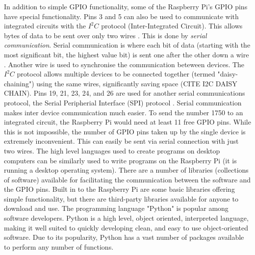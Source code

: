 \documentclass[a4]{report}
\begin{document}
	In addition to simple GPIO functionality, some of the Raspberry Pi's GPIO pins have special functionality. Pins 3 and 5 can also be used to communicate with integrated circuits with the \(I^2 C\) protocol (Inter-Integrated Circuit). This allows bytes of data to be sent over only two wires \cite{backwhatisi2c}. This is done by \textit{serial communication}. Serial communication is where each bit of data (starting with the most significant bit, the highest value bit) is sent one after the other down a wire \cite{backwhatisserpar}. Another wire is used to synchronise the communication beteween devices. The \(I^2 C\) protocol allows multiple devices to be connected together (termed "daisy-chaining") using the same wires, significantly saving space (CITE I2C DAISY CHAIN). Pins 19, 21, 23, 24, and 26 are used for another serial communications protocol, the Serial Peripherial Interface (SPI) protocol \cite{backwhatisspi}. Serial communication makes inter device communication much easier. To send the number 1750 to an integrated circuit, the Raspberry Pi would need at least 11 free GPIO pins. While this is not impossible, the number of GPIO pins taken up by the single device is extremely inconvenient. This can easily be sent via serial connection with just two wires.\newline \newline  \noindent
	The high level languages used to create programs on desktop computers can be similarly used to write programs on the Raspberry Pi (it is running a desktop operating system). There are a number of libraries (collections of software) available for facilitating the communication between the software and the GPIO pins. Built in to the Raspberry Pi are some basic libraries offering simple functionality, but there are third-party libraries available for anyone to download and use\cite{pilibswiringpi, pilibspigpio}. The programming language "Python" is popular among software developers. Python is a high level, object oriented, interpreted language, making it well suited to quickly developing clean, and easy to use object-oriented software. Due to its popularity, Python has a vast number of packages available to perform any number of functions. \newline \newline \noindent
\end{document}
